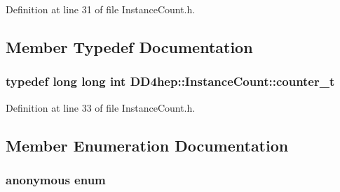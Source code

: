Definition at line 31 of file InstanceCount.h.

\subsection{Member Typedef Documentation}
\hypertarget{struct_d_d4hep_1_1_instance_count_ae81dc0c76b135425e14b6dc38262a727}{
\subsubsection[{counter\_\-t}]{\setlength{\rightskip}{0pt plus 5cm}typedef long long int {\bf DD4hep::InstanceCount::counter\_\-t}}}
\label{struct_d_d4hep_1_1_instance_count_ae81dc0c76b135425e14b6dc38262a727}


Definition at line 33 of file InstanceCount.h.

\subsection{Member Enumeration Documentation}
\hypertarget{struct_d_d4hep_1_1_instance_count_ae1ac289e30ac5ae83640ae2ed97f947c}{
\subsubsection[{"@2}]{\setlength{\rightskip}{0pt plus 5cm}anonymous enum}}
\label{struct_d_d4hep_1_1_instance_count_ae1ac289e30ac5ae83640ae2ed97f947c}


